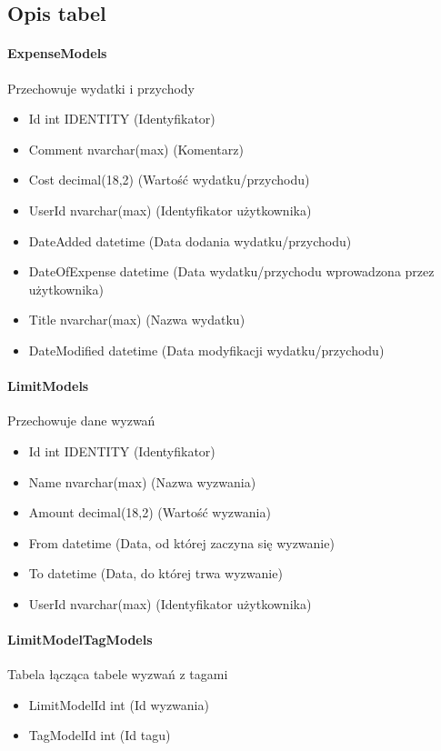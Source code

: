 \documentclass[10pt,titlepage]{article}
\begin{document}
\subsection{Opis tabel}
\paragraph[short]{ExpenseModels}
Przechowuje wydatki i przychody
\begin{itemize}
  \item Id int IDENTITY (Identyfikator)
  \item Comment nvarchar(max) (Komentarz)
  \item Cost decimal(18,2) (Wartość wydatku/przychodu)
  \item UserId nvarchar(max) (Identyfikator użytkownika)
  \item DateAdded datetime (Data dodania wydatku/przychodu)
  \item DateOfExpense datetime (Data wydatku/przychodu wprowadzona przez użytkownika)
  \item Title nvarchar(max) (Nazwa wydatku)
  \item DateModified datetime (Data modyfikacji wydatku/przychodu)
\end{itemize}
\paragraph[short]{LimitModels}
Przechowuje dane wyzwań
\begin{itemize}
  \item Id int IDENTITY (Identyfikator)
  \item Name nvarchar(max) (Nazwa wyzwania)
  \item Amount decimal(18,2) (Wartość wyzwania)
  \item From datetime (Data, od której zaczyna się wyzwanie)
  \item To datetime (Data, do której trwa wyzwanie)
  \item UserId nvarchar(max) (Identyfikator użytkownika)
\end{itemize}
\paragraph[short]{LimitModelTagModels}
Tabela łącząca tabele wyzwań z tagami
\begin{itemize}
  \item LimitModelId int (Id wyzwania)
  \item TagModelId int (Id tagu)
\end{itemize}
\end{document}
